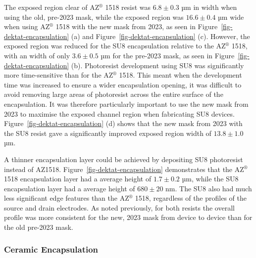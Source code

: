 \documentclass[
  a4paper,
]{scrbook}
\begin{document}
The exposed region clear of AZ\(^\circledR\) 1518 resist was
\(6.8 \pm 0.3\) µm in width when using the old, pre-2023 mask, while the
exposed region was \(16.6 \pm 0.4\) µm wide when using AZ\(^\circledR\)
1518 with the new mask from 2023, as seen in
Figure~\ref{fig-dektat-encapsulation} (a) and
Figure~\ref{fig-dektat-encapsulation} (c). However, the exposed region
was reduced for the SU8 encapsulation relative to the AZ\(^\circledR\)
1518, with an width of only \(3.6 \pm 0.5\) µm for the pre-2023 mask, as
seen in Figure~\ref{fig-dektat-encapsulation} (b). Photoresist
development using SU8 was significantly more time-sensitive than for the
AZ\(^\circledR\) 1518. This meant when the development time was
increased to ensure a wider encapsulation opening, it was difficult to
avoid removing large areas of photoresist across the entire surface of
the encapsulation. It was therefore particularly important to use the
new mask from 2023 to maximise the exposed channel region when
fabricating SU8 devices. Figure~\ref{fig-dektat-encapsulation} (d) shows
that the new mask from 2023 with the SU8 resist gave a significantly
improved exposed region width of \(13.8 \pm 1.0\) µm.

A thinner encapsulation layer could be achieved by depositing SU8
photoresist instead of AZ1518. Figure~\ref{fig-dektat-encapsulation}
demonstrates that the AZ\(^\circledR\) 1518 encapsulation layer had a
average height of \(1.7 \pm 0.2\) µm, while the SU8 encapsulation layer
had a average height of \(680 \pm 20\) nm. The SU8 also had much less
significant edge features than the AZ\(^\circledR\) 1518, regardless of
the profiles of the source and drain electrodes. As noted previously,
for both resists the overall profile was more consistent for the new,
2023 mask from device to device than for the old pre-2023 mask.

\hypertarget{sec-ceramic}{%
\subsubsection{Ceramic Encapsulation}\label{sec-ceramic}}
\end{document}

